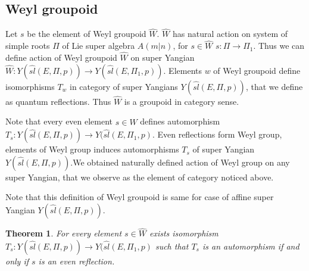\documentclass[english]{elsarticle}
\newtheorem{theorem}{Theorem}[section]
\numberwithin{equation}{section}
\begin{document}
\subsection{Weyl groupoid}

Let $s$ be the element of Weyl groupoid $\hat{W}$. $\hat{W}$ has natural action on system of simple roots $\Pi$ of Lie super algebra $A(m|n)$, for $s \in \hat{W}$ $s:\Pi \rightarrow \Pi_1$. Thus we can define action of Weyl groupoid $\hat{W}$ on super Yangian $\hat{W}:Y(\hat{sl}(E,\Pi,p))\rightarrow Y(\hat{sl}(E,\Pi_1,p))$. Elements $w$ of Weyl groupoid define isomorphisms $T_{w}$ in category of super Yangians $Y(\hat{sl}(E,\Pi,p))$, that we define as quantum reflections. Thus $\hat{W}$ is a groupoid in category sense.



Note that every even element $s\in \hat{W}$ defines automorphism $T_s:Y(\hat{sl}(E,\Pi,p))\rightarrow Y(\hat{sl}(E,\Pi_1,p)$.
Even reflections form Weyl group, elements of Weyl group induces automorphisms $T_{s}$ of super Yangian $Y(\hat{sl}(E,\Pi,p))$.We obtained naturally defined action of Weyl group on any super Yangian, that we observe as the element of category noticed above.

Note that this definition of Weyl groupoid is  same for case of affine super Yangian $Y(\hat{sl}(E,\Pi,p))$.


\begin{theorem}
For every element $s \in \hat{W}$ exists isomorphism $T_s:Y(\hat{sl}(E,\Pi,p))\rightarrow Y(\hat{sl}(E,\Pi_1,p)$ such that $T_s$ is an automorphism if and only if $s$ is an even reflection.
\end{theorem}
\end{document}
